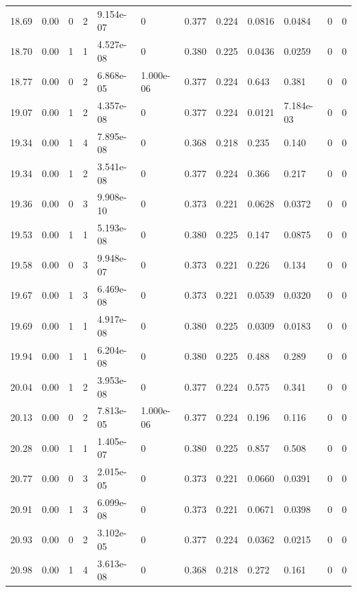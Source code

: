 \documentclass[preview]{standalone}
\begin{document}
{{{\begin{tabular}{L{1.2cm}C{1.2cm} C{0.3cm}C{0.5cm} C{1.4cm}C{1.4cm} C{1.4cm}C{1.4cm} C{1.6cm}C{1.6cm} C{1.6cm}C{1.6cm}}
  18.69  &  0.00  & 0     &  2 &  9.154e-07  & 0  &  0.377&   0.224& 0.0816 & 0.0484   &  0 & 0  \\ 
  18.70  &  0.00  & 1     &  1 &  4.527e-08  & 0  &  0.380&   0.225& 0.0436 & 0.0259   &  0 & 0  \\ 
  18.77  &  0.00  & 0     &  2 &  6.868e-05  & 1.000e-06  &  0.377&   0.224& 0.643 & 0.381   &  0 & 0  \\ 
  19.07  &  0.00  & 1     &  2 &  4.357e-08  & 0  &  0.377&   0.224& 0.0121 & 7.184e-03   &  0 & 0  \\ 
  19.34  &  0.00  & 1     &  4 &  7.895e-08  & 0  &  0.368&   0.218& 0.235 & 0.140   &  0 & 0  \\ 
  19.34  &  0.00  & 1     &  2 &  3.541e-08  & 0  &  0.377&   0.224& 0.366 & 0.217   &  0 & 0  \\ 
  19.36  &  0.00  & 0     &  3 &  9.908e-10  & 0  &  0.373&   0.221& 0.0628 & 0.0372   &  0 & 0  \\ 
  19.53  &  0.00  & 1     &  1 &  5.193e-08  & 0  &  0.380&   0.225& 0.147 & 0.0875   &  0 & 0  \\ 
  19.58  &  0.00  & 0     &  3 &  9.948e-07  & 0  &  0.373&   0.221& 0.226 & 0.134   &  0 & 0  \\ 
  19.67  &  0.00  & 1     &  3 &  6.469e-08  & 0  &  0.373&   0.221& 0.0539 & 0.0320   &  0 & 0  \\ 
  19.69  &  0.00  & 1     &  1 &  4.917e-08  & 0  &  0.380&   0.225& 0.0309 & 0.0183   &  0 & 0  \\ 
  19.94  &  0.00  & 1     &  1 &  6.204e-08  & 0  &  0.380&   0.225& 0.488 & 0.289   &  0 & 0  \\ 
  20.04  &  0.00  & 1     &  2 &  3.953e-08  & 0  &  0.377&   0.224& 0.575 & 0.341   &  0 & 0  \\ 
  20.13  &  0.00  & 0     &  2 &  7.813e-05  & 1.000e-06  &  0.377&   0.224& 0.196 & 0.116   &  0 & 0  \\ 
  20.28  &  0.00  & 1     &  1 &  1.405e-07  & 0  &  0.380&   0.225& 0.857 & 0.508   &  0 & 0  \\ 
  20.77  &  0.00  & 0     &  3 &  2.015e-05  & 0  &  0.373&   0.221& 0.0660 & 0.0391   &  0 & 0  \\ 
  20.91  &  0.00  & 1     &  3 &  6.099e-08  & 0  &  0.373&   0.221& 0.0671 & 0.0398   &  0 & 0  \\ 
  20.93  &  0.00  & 0     &  2 &  3.102e-05  & 0  &  0.377&   0.224& 0.0362 & 0.0215   &  0 & 0  \\ 
  20.98  &  0.00  & 1     &  4 &  3.613e-08  & 0  &  0.368&   0.218& 0.272 & 0.161   &  0 & 0  \\ 

\end{tabular}}}}
\end{document}
